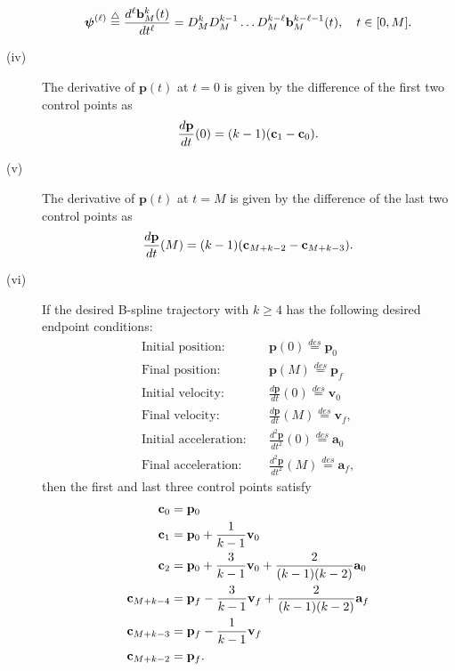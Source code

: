 \begin{corollary}
\begin{description}
		\[
			\boldsymbol{\psi}^{(\ell)} \stackrel{\triangle}{=} \frac{d^{\ell}\mathbf{b}_M^k(t)}{dt^{\ell}} = D_M^k D_M^{k-1} \dots D_M^{k-\ell} \mathbf{b}_M^{k-\ell-1}(t), \quad t\in [0, M].
		\]
	\item[(iv)] The derivative of $\mathbf{p}(t)$ at $t=0$ is given by the difference of the first two control points as
		\[
			\frac{d\mathbf{p}}{dt}(0) = (k-1)(\mathbf{c}_1 - \mathbf{c}_0).
		\]
	\item[(v)] The derivative of $\mathbf{p}(t)$ at $t=M$ is given by the difference of the last two control points as
		\[
			\frac{d\mathbf{p}}{dt}(M) = (k-1)(\mathbf{c}_{M+k-2} - \mathbf{c}_{M+k-3}).
		\]
	\item[(vi)] If the desired B-spline trajectory with $k\geq 4$ has the following desired endpoint conditions:
		\begin{align*}
			\text{Initial position:} &\quad \mathbf{p}(0) \stackrel{des}{=} \mathbf{p}_0 \\	
			\text{Final position:} &\quad \mathbf{p}(M) \stackrel{des}{=} \mathbf{p}_f \\
			\text{Initial velocity:} &\quad \frac{d\mathbf{p}}{dt}(0) \stackrel{des}{=} \mathbf{v}_0 \\	
			\text{Final velocity:} &\quad \frac{d\mathbf{p}}{dt}(M) \stackrel{des}{=} \mathbf{v}_f, \\
			\text{Initial acceleration:} &\quad \frac{d^2\mathbf{p}}{dt^2}(0) \stackrel{des}{=} \mathbf{a}_0 \\	
			\text{Final acceleration:} &\quad \frac{d^2\mathbf{p}}{dt^2}(M) \stackrel{des}{=} \mathbf{a}_f,
		\end{align*}
		then the first and last three control points satisfy
		\begin{align*}
			\mathbf{c}_0 &= \mathbf{p}_0 \\
			\mathbf{c}_1 &= \mathbf{p}_0 + \frac{1}{k-1} \mathbf{v}_0 \\
			\mathbf{c}_2 &= \mathbf{p}_0 + \frac{3}{k-1} \mathbf{v}_0 + \frac{2}{(k-1)(k-2)}\mathbf{a}_0 \\
			\mathbf{c}_{M+k-4} &= \mathbf{p}_f - \frac{3}{k-1}\mathbf{v}_f + \frac{2}{(k-1)(k-2)}\mathbf{a}_f \\
			\mathbf{c}_{M+k-3} &= \mathbf{p}_f - \frac{1}{k-1}\mathbf{v}_f \\
			\mathbf{c}_{M+k-2} &= \mathbf{p}_f.
		\end{align*}
	\end{description}
\end{corollary}



